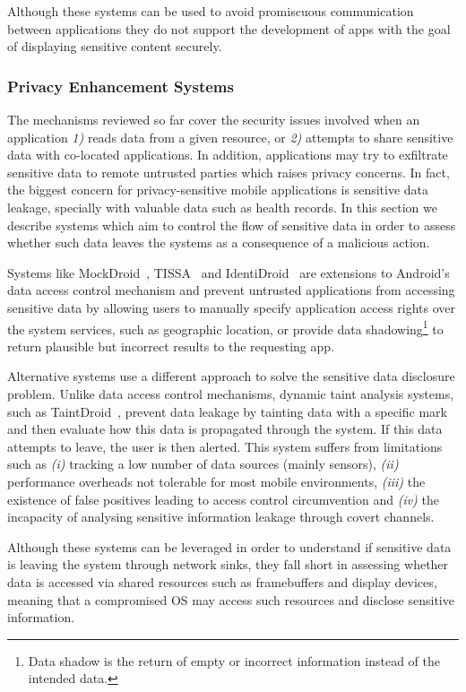 Although these systems can be used to avoid promiscuous communication between applications they do not support the development of apps with the goal of displaying sensitive content securely.

\subsubsection{Privacy Enhancement Systems}

The mechanisms reviewed so far cover the security issues involved when an application \emph{1)} reads data from a given resource, or \emph{2)} attempts to share sensitive data with co-located applications. In addition, applications may try to exfiltrate sensitive data to remote untrusted parties which raises privacy concerns. In fact, the biggest concern for privacy-sensitive mobile applications is sensitive data leakage, specially with valuable data such as health records. In this section we describe systems which aim to control the flow of sensitive data in order to assess whether such data leaves the systems as a consequence of a malicious action.

Systems like MockDroid~\cite{beresford2011mockdroid}, TISSA~\cite{zhou2011taming} and IdentiDroid~\cite{shebaro2014identidroid} are extensions to Android's data access control mechanism and prevent untrusted applications from accessing sensitive data by allowing users to manually specify application access rights over the system services, such as geographic location, or provide data shadowing\footnote{Data shadow is the return of empty or incorrect information instead of the intended data.} to return plausible but incorrect results to the requesting app.

Alternative systems use a different approach to solve the sensitive data disclosure problem. Unlike data access control mechanisms, dynamic taint analysis systems, such as TaintDroid~\cite{enck2014taintdroid}, prevent data leakage by tainting data with a specific mark and then evaluate how this data is propagated through the system. If this data attempts to leave, the user is then alerted. This system suffers from limitations such as \emph{(i)} tracking a low number of data sources (mainly sensors), \emph{(ii)} performance overheads not tolerable for most mobile environments, \emph{(iii)} the existence of false positives leading to access control circumvention and \emph{(iv)} the incapacity of analysing sensitive information leakage through covert channels.

Although these systems can be leveraged in order to understand if sensitive data is leaving the system through network sinks, they fall short in assessing whether data is accessed via shared resources such as framebuffers and display devices, meaning that a compromised OS may access such resources and disclose sensitive information.

